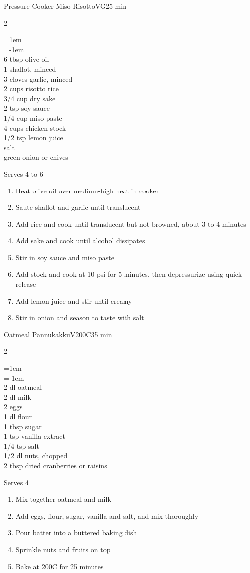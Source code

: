 \documentclass{article}
\newenvironment{recipe}[3][]
    {\begin{cardbase}[#1]{#2}{#3}
    \columnratio{0.333}
    \begin{paracol}{2}}
    {\end{paracol}\end{cardbase}}
\newenvironment{denserecipe}[3][]
    {\small
    \begin{recipe}[#1]{#2}{#3}}
    {\end{recipe}}
\newcommand{\nextcolumn}{\switchcolumn}
\newenvironment{ingredients}
    {
    \begin{obeylines}
    \vspace{\parskip}
    \setlength{\parskip}{0.25em}
    \vspace{-0.25em}
    \leftskip=1em
    \parindent=-1em}
    {\end{obeylines}}
\newenvironment{steps}
    {\begin{enumerate}[leftmargin=*,topsep=0pt]}
    {\end{enumerate}}
\newcommand{\celsius}[1]{#1\textdegree{}C}
\newcommand{\tag}[1]{\hspace{1em}#1}
\newcommand{\symboltag}[2]{\tag{#1\hspace{0.4em}#2}}
\newcommand{\totaltime}[1]{\symboltag{\raisebox{-0.1em}{\small\StopWatchEnd}}{#1}}
\newcommand{\preheat}[1]{\symboltag{\Topbottomheat}{#1}}
\begin{document}
\begin{denserecipe}{Pressure Cooker Miso Risotto}{\tag{VG}\totaltime{25 min}}
\begin{ingredients}
6 tbsp olive oil
1 shallot, minced
3 cloves garlic, minced
2 cups risotto rice
3/4 cup dry sake
2 tsp soy sauce
1/4 cup miso paste
4 cups chicken stock
1/2 tsp lemon juice
salt
green onion or chives
\end{ingredients}
\nextcolumn
Serves 4 to 6
\begin{steps}
    \item Heat olive oil over medium-high heat in cooker
    \item Saute shallot and garlic until translucent
    \item Add rice and cook until translucent but not browned, about 3 to 4 minutes
    \item Add sake and cook until alcohol dissipates
    \item Stir in soy sauce and miso paste
    \item Add stock and cook at 10 psi for 5 minutes, then depressurize using quick release
    \item Add lemon juice and stir until creamy
    \item Stir in onion and season to taste with salt
\end{steps}
\end{denserecipe}

\begin{recipe}{Oatmeal Pannukakku}{\tag{V}\preheat{\celsius{200}}\totaltime{35 min}}
\begin{ingredients}
2 dl oatmeal
2 dl milk
2 eggs
1 dl flour
1 tbsp sugar
1 tsp vanilla extract
1/4 tsp salt
1/2 dl nuts, chopped
2 tbsp dried cranberries or raisins
\end{ingredients}
\nextcolumn
Serves 4
\begin{steps}
    \item Mix together oatmeal and milk
    \item Add eggs, flour, sugar, vanilla and salt, and mix thoroughly
    \item Pour batter into a buttered baking dish
    \item Sprinkle nuts and fruits on top
    \item Bake at \celsius{200} for 25 minutes
\end{steps}
\end{recipe}
\end{document}
